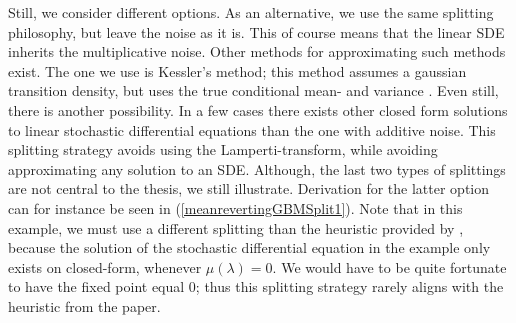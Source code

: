 Still, we consider different options. As an alternative, we use the same splitting philosophy, but leave the noise as it is. This of course means that the linear SDE inherits the multiplicative noise. Other methods for approximating such methods exist. The one we use is Kessler's method; this method assumes a gaussian transition density, but uses the true conditional mean- and variance \cite[section 2.4.3.]{SplittingSchemes}. Even still, there is another possibility. In a few cases there exists other closed form solutions to linear stochastic differential equations than the one with additive noise. This splitting strategy avoids using the Lamperti-transform, while avoiding approximating any solution to an SDE. Although, the last two types of splittings are not central to the thesis, we still illustrate. Derivation for the latter option can for instance be seen in (\ref{meanrevertingGBMSplit1}). Note that in this example, we must use a different splitting than the heuristic provided by \cite[section 2.3 and 2.5]{SplittingSchemes}, because the solution of the stochastic differential equation in the example only exists on closed-form, whenever $\mu(\lambda) = 0$. We would have to be quite fortunate to have the fixed point equal 0; thus this splitting strategy rarely aligns with the heuristic from the paper.
